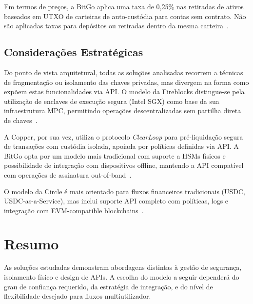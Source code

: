 Em termos de preços, a BitGo aplica uma taxa de 0,25\% nas retiradas de ativos baseados em UTXO de carteiras de auto-custódia para contas sem contrato. Não são aplicadas taxas para depósitos ou retiradas dentro da mesma carteira~\cite{bitgopricing2023}.

\subsection{Considerações Estratégicas}
Do ponto de vista arquitetural, todas as soluções analisadas recorrem a técnicas de fragmentação ou isolamento das chaves privadas, mas divergem na forma como expõem estas funcionalidades via API. O modelo da Fireblocks distingue-se pela utilização de enclaves de execução segura (Intel SGX) como base da sua infraestrutura MPC, permitindo operações descentralizadas sem partilha direta de chaves~\cite{fireblocks2023}.

A Copper, por sua vez, utiliza o protocolo \textit{ClearLoop} para pré-liquidação segura de transações com custódia isolada, apoiada por políticas definidas via API. A BitGo opta por um modelo mais tradicional com suporte a HSMs físicos e possibilidade de integração com dispositivos offline, mantendo a API compatível com operações de assinatura out-of-band~\cite{bitgo2023}.

O modelo da Circle é mais orientado para fluxos financeiros tradicionais (USDC, USDC-as-a-Service), mas inclui suporte API completo com políticas, logs e integração com EVM-compatible blockchains~\cite{circle2023}.

\section*{Resumo}
As soluções estudadas demonstram abordagens distintas à gestão de segurança, isolamento físico e design de APIs. A escolha do modelo a seguir dependerá do grau de confiança requerido, da estratégia de integração, e do nível de flexibilidade desejado para fluxos multiutilizador.